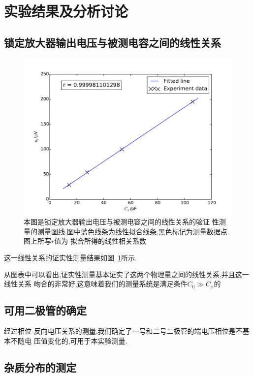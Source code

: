 \documentclass[aps,pre,12pt,preprint,onecolumn,showpacs,showkeys]{revtex4-1}
\begin{document}
\section{实验结果及分析讨论}

\subsection{锁定放大器输出电压与被测电容之间的线性关系}

\begin{figure}
\begin{center}
    \includegraphics[width=\textwidth]{plot1.pdf}
\end{center}
\caption{\label{fig:plot1}本图是锁定放大器输出电压与被测电容之间的线性关系的验证
性测量的测量图线.图中蓝色线条为线性拟合线条,黑色标记为测量数据点.图上所写$r$值为
拟合所得的线性相关系数}
\end{figure}


这一线性关系的证实性测量结果如图~\ref{fig:plot1}所示.

从图表中可以看出,证实性测量基本证实了这两个物理量之间的线性关系,并且这一线性关系
吻合的非常好,这意味着我们的测量系统是满足条件$C_0 \gg C_x$的

\subsection{可用二极管的确定}

经过相位-反向电压关系的测量,我们确定了一号和二号二极管的端电压相位是不基本不随电
压值变化的,可用于本实验测量.


\subsection{杂质分布的测定}
\end{document}
